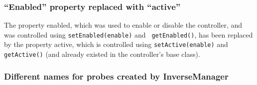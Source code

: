 \documentclass{article}
\begin{document}
\subsubsection*{``Enabled'' property replaced with ``active''}

The property {\sf enabled}, which was used to enable or disable the
controller, and was controlled using {\tt setEnabled(enable)} and {\tt
getEnabled()}, has been replaced by the property {\sf active}, which
is controlled using {\tt setActive(enable)} and {\tt getActive()} (and
already existed in the controller's base class).

\subsubsection*{Different names for probes created by InverseManager}
\end{document}

